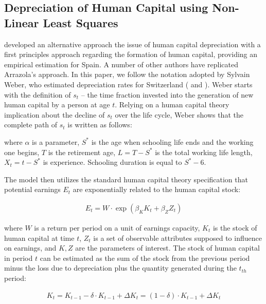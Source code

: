 \documentclass[alpha-refs]{wiley-article-02b}
\begin{document}
\setcounter{table}{2} %


\subsection{Depreciation of Human Capital using Non-Linear Least Squares}

\citet{Arrazola_2005} developed an alternative approach the issue of human capital depreciation with a first principles approach regarding the formation of human capital, providing an empirical estimation for Spain.  A number of other authors have replicated Arrazola's approach. In this paper, we follow the notation adopted by Sylvain Weber, who estimated depreciation rates for Switzerland (\citet{Weber_2008} and \citet{Weber_2011}). Weber starts with the definition of $s_{t}$ -- the time fraction invested into the generation of new human capital by a person at age $t$. Relying on a human capital theory implication about the decline of $s_{t}$ over the life cycle, Weber shows that the complete path of $s_{t}$ is written as follows:



\noindent
where $\alpha$ is a parameter, $S^{*}$ is the age when schooling life ends and the working one begins, $T$ is the retirement age, $L = T - S^{*}$ is the total working life length, $X_{t} = t - S^{*}$ is experience. Schooling duration is equal to $S^{*} - 6$.

The model then utilizes the standard human capital theory specification that potential earnings $E_{t}$ are exponentially related to the human capital stock:

\begin{align*}\label{eq:2.7} 
E_{t}=W \cdot \exp \left(\beta_{K} K_{t}+\beta_{Z} Z_{t}\right)
\end{align*}



\noindent
where $W$ is a return per period on a unit of earnings capacity, $K_{t}$  is the stock of human capital at time $t$, $Z_{t}$ is a set of observable attributes supposed to influence on earnings, and $K, Z$ are the parameters of interest. The stock of human capital in period $t$ can be estimated as the sum of the stock from the previous period minus the loss due to depreciation plus the quantity generated during the $t_{th}$ period:

\begin{align*}\label{eq:2.8} 
K_{t}=K_{t-1}-\delta \cdot K_{t-1}+\Delta K_{t}=(1-\delta) \cdot K_{t-1}+\Delta K_{t}
\end{align*}
\end{document}
